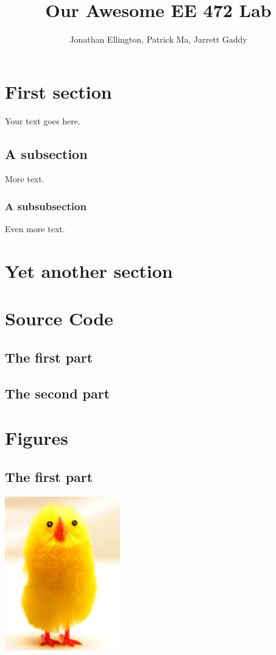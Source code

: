 \documentclass[12pt]{article} %
\title{\fontsize{16}{20} \selectfont Our Awesome EE 472 Lab}
\author{\fontsize{14}{17} \selectfont Jonathan Ellington, Patrick Ma, Jarrett Gaddy}
\date{}
\begin{document}
\maketitle
\thispagestyle{empty}
\pagebreak
\tableofcontents
\thispagestyle{empty}
\pagebreak
\setcounter{page}{1}

\section{First section}

Your text goes here.

\subsection{A subsection}

More text.

\subsubsection{A subsubsection}

Even more text.

\section{Yet another section}

\pagebreak
\appendix

\section{Source Code}
\subsection{The first part}


\subsection{The second part}


\section{Figures}
\subsection{The first part}
\includegraphics{figure1.png}
\end{document}
